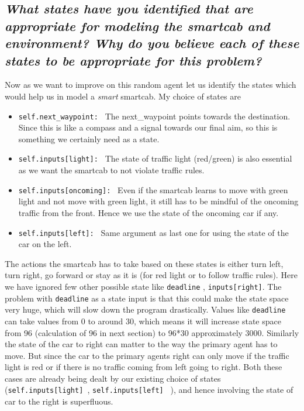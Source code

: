 \documentclass[paper=a4, fontsize=11pt]{scrartcl}
\numberwithin{equation}{section}		%
\numberwithin{figure}{section}			%
\numberwithin{table}{section}				%
\begin{document}
\subsection{ \textit{What states have you identified that are appropriate for modeling the \textbf{smartcab} and environment? Why do you believe each of these states to be appropriate for this problem?} } 

Now as we want to improve on this random agent let us identify the states which would help us in model a \textit{smart} smartcab.  My choice of states are

\begin{itemize}
	\item   \texttt{self.next\_waypoint: } The next\_waypoint points towards the destination. Since this is like a compass and a signal towards our final aim, so this is something we certainly need as a state.
	\item   \texttt{self.inputs[\textquotesingle light\textquotesingle]: } The state of traffic light (red/green) is also essential as we want the smartcab to not violate traffic rules.
	\item   \texttt{self.inputs[\textquotesingle oncoming\textquotesingle]: } Even if the smartcab learns to move with green light and not move with green light, it still has to be mindful of the oncoming traffic from the front. Hence we use the state of the oncoming car if any.
	\item   \texttt{self.inputs[\textquotesingle left\textquotesingle ]: }  Same argument as last one for using the state of the car on the left.
\end{itemize}


The actions the smartcab has to take based on these states is either turn left, turn right, go forward or stay as it is (for red light or to follow traffic rules). Here we have ignored few other possible state like  \texttt{deadline} , \texttt{inputs[\textquotesingle right\textquotesingle]}. The problem with \texttt{deadline} as a state input is that this could make the state space very huge, which will slow down the program drastically. Values like  \texttt{deadline} can take values from 0 to around 30, which means it will increase state space from 96 (calculation of 96 in next section) to 96*30 approximately 3000. 
Similarly the state of the car to right can matter to the way the primary agent has to move. But since the car to the primary agents right can only move if the traffic light is red or if there is no traffic coming from left going to right. Both these cases are already being dealt by our existing choice of states (\texttt{self.inputs[\textquotesingle light\textquotesingle] },   \texttt{self.inputs[\textquotesingle left\textquotesingle ] }   ), and hence involving the state of  car to the right is superfluous.
\end{document}
